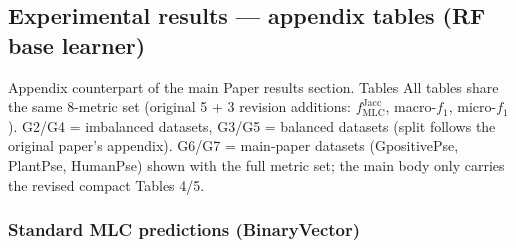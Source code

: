 \documentclass[11pt]{article}
\begin{document}
\FloatBarrier

\subsection{Experimental results --- appendix tables (RF base learner)}\label{sec:paperapp-rf}

Appendix counterpart of the main Paper results section. Tables All tables share the same 8-metric set (original 5 + 3 revision additions: $f^{\mathrm{Jacc}}_{\mathrm{MLC}}$, macro-$f_1$, micro-$f_1$). G2/G4 = imbalanced datasets, G3/G5 = balanced datasets (split follows the original paper's appendix). G6/G7 = main-paper datasets (GpositivePse, PlantPse, HumanPse) shown with the full metric set; the main body only carries the revised compact Tables 4/5.


\subsubsection{Standard MLC predictions (BinaryVector)}
\end{document}
